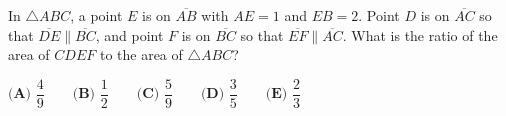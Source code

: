In $\triangle ABC$, a point $E$ is on $\overline{AB}$ with $AE=1$ and $EB=2$. Point $D$ is on $\overline{AC}$ so that $\overline{DE}\parallel\overline{BC}$, and point $F$ is on $\overline{BC}$ so that $\overline{EF}\parallel\overline{AC}$. What is the ratio of the area of $CDEF$ to the area of $\triangle ABC$?

$\textbf{(A) }\dfrac49\qquad\textbf{(B) }\dfrac12\qquad\textbf{(C) }\dfrac59\qquad\textbf{(D) }\dfrac35\qquad\textbf{(E) }\dfrac23$
